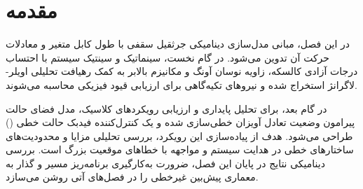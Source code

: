 
\section{مقدمه}

در این فصل، مبانی مدل‌سازی دینامیکی جرثقیل سقفی با طول کابل متغیر و معادلات حرکت آن تدوین می‌شود. در گام نخست، سینماتیک و سینتیک سیستم با احتساب درجات آزادی کالسکه، زاویه نوسان آونگ و مکانیزم بالابر به کمک رهیافت تحلیلی اویلر-لاگرانژ استخراج شده و نیروهای تکیه‌گاهی برای ارزیابی قیود فیزیکی محاسبه می‌شوند.

در گام بعد، برای تحلیل پایداری و ارزیابی رویکردهای کلاسیک، مدل فضای حالت پیرامون وضعیت تعادل آویزان خطی‌سازی شده و یک کنترل‌کننده فیدبک حالت خطی () طراحی می‌شود. هدف از پیاده‌سازی این رویکرد، بررسی تحلیلی مزایا و محدودیت‌های ساختارهای خطی در هدایت سیستم و مواجهه با خطاهای موقعیت بزرگ است. بررسی دینامیکی نتایج در پایان این فصل، ضرورت به‌کارگیری برنامه‌ریز مسیر و گذار به معماری پیش‌بین غیرخطی را در فصل‌های آتی روشن می‌سازد.